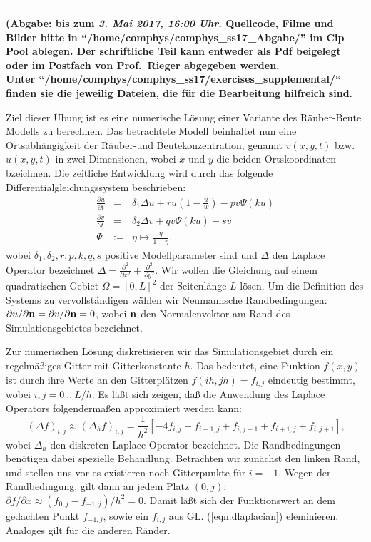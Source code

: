 \documentclass{exam}
\begin{document}
\vspace*{-0.5cm}\hrule
\begin{center} 
{\bfseries \sf(Abgabe: bis zum \textit{3. Mai 2017, 16:00 Uhr}.
Quellcode, Filme und Bilder bitte in ``/home/comphys/comphys\_ss17\_Abgabe/'' im Cip Pool ablegen.
Der schriftliche Teil kann entweder als Pdf beigelegt oder im Postfach von Prof.~Rieger abgegeben werden.
\\
Unter ``/home/comphys/comphys\_ss17/exercises\_supplemental/`` finden sie die jeweilig Dateien, die 
f\"ur die Bearbeitung hilfreich sind.}\\[.3cm]
\end{center}

Ziel dieser Übung ist es eine numerische Lösung einer Variante des Räuber-Beute Modells zu berechnen.
Das betrachtete Modell beinhaltet nun eine Ortsabhängigkeit der Räuber-und
Beutekonzentration, genannt  $v(x, y, t)$ bzw. $u(x, y, t)$ in zwei Dimensionen, wobei $x$ und $y$ die beiden Ortskoordinaten
bzeichnen. Die zeitliche Entwicklung wird durch das folgende
Differentialgleichungssystem beschrieben:
\begin{eqnarray}
\label{eqn:rb}
\frac{\partial u}{\partial t} &=& \delta_1 \Delta u + r u \left(1 - \frac{u}{w} \right) - p v \Psi(k u) \\
\frac{\partial v}{\partial t} &=& \delta_2 \Delta v + q v \Psi(k u) - s v \nonumber \\
\Psi &:=& \eta \mapsto \tfrac{\eta}{1+\eta} \nonumber\text{,}
\end{eqnarray}
wobei $\delta_1, \delta_2, r, p, k, q, s$ positive Modellparameter sind und 
$\Delta$ den Laplace Operator bezeichnet $\Delta = 
\frac{\partial^2}{\partial x^2} + \frac{\partial^2}{\partial y^2}$. Wir wollen 
die Gleichung auf einem quadratischen Gebiet $\Omega = [0, L]^2$ der Seitenlänge 
$L$ lösen. Um die Definition des Systems zu vervollständigen wählen wir 
Neumannsche Randbedingungen: $\partial u/\partial {\bf n} = \partial v/\partial 
{\bf n} = 0$, wobei ${\bf n}$ den Normalenvektor am Rand des Simulationsgebietes 
bezeichnet.

Zur numerischen Lösung diskretisieren wir das Simulationsgebiet durch ein regelmäßiges Gitter mit
Gitterkonstante $h$. Das bedeutet, eine Funktion $f(x, y)$ ist durch ihre Werte an den Gitterplätzen
$f(i h, j h) = f_{i,j}$ eindeutig bestimmt, wobei $i,j = 0\ ..\ L/h$. Es läßt sich zeigen, daß die
Anwendung des Laplace Operators folgendermaßen approximiert werden kann:
\begin{equation}
\label{eqn:dlaplacian}
(\Delta f)_{i,j} \approx (\Delta_h f)_{i,j} = \frac{1}{h^2} [ -4 f_{i,j} + f_{i-1,j} + f_{i,j-1} + f_{i+1,j} + f_{i,j+1} ]\text{,}
\end{equation}
wobei $\Delta_h$ den diskreten Laplace Operator bezeichnet.
Die Randbedingungen benötigen dabei spezielle Behandlung. Betrachten wir zunächst den linken Rand, und
stellen uns vor es existieren noch Gitterpunkte für $i = -1$. Wegen der Randbedingung, gilt dann an
jedem Platz $(0,j)$: $\partial f/\partial x \approx (f_{0,j} - f_{-1,j})/h^2 = 0$. Damit läßt sich
der Funktionswert an dem gedachten Punkt $f_{-1,j}$, sowie ein $f_{i,j}$ aus GL. (\ref{eqn:dlaplacian})
eleminieren. Analoges gilt für die anderen Ränder.
\end{document}

